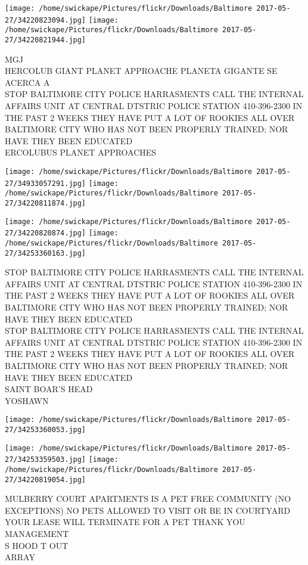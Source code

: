 \documentclass[10pt,letterpaper]{article}
\begin{document}
\texttt{[image: /home/swickape/Pictures/flickr/Downloads/Baltimore 2017-05-27/34220823094.jpg]}
\texttt{[image: /home/swickape/Pictures/flickr/Downloads/Baltimore 2017-05-27/34220821944.jpg]}

MGJ\\
HERCOLUB GIANT PLANET APPROACHE PLANETA GIGANTE SE ACERCA A\\
STOP BALTIMORE CITY POLICE HARRASMENTS CALL THE INTERNAL AFFAIRS UNIT AT CENTRAL DTSTRIC POLICE STATION 410{-}396{-}2300 IN THE PAST 2 WEEKS THEY HAVE PUT A LOT OF ROOKIES ALL OVER BALTIMORE CITY WHO HAS NOT BEEN PROPERLY TRAINED; NOR HAVE THEY BEEN EDUCATED\\
ERCOLUBUS PLANET APPROACHES
\pagebreak

\texttt{[image: /home/swickape/Pictures/flickr/Downloads/Baltimore 2017-05-27/34933057291.jpg]}
\texttt{[image: /home/swickape/Pictures/flickr/Downloads/Baltimore 2017-05-27/34220811874.jpg]}

\texttt{[image: /home/swickape/Pictures/flickr/Downloads/Baltimore 2017-05-27/34220820874.jpg]}
\texttt{[image: /home/swickape/Pictures/flickr/Downloads/Baltimore 2017-05-27/34253360163.jpg]}

STOP BALTIMORE CITY POLICE HARRASMENTS CALL THE INTERNAL AFFAIRS UNIT AT CENTRAL DTSTRIC POLICE STATION 410{-}396{-}2300 IN THE PAST 2 WEEKS THEY HAVE PUT A LOT OF ROOKIES ALL OVER BALTIMORE CITY WHO HAS NOT BEEN PROPERLY TRAINED; NOR HAVE THEY BEEN EDUCATED\\
STOP BALTIMORE CITY POLICE HARRASMENTS CALL THE INTERNAL AFFAIRS UNIT AT CENTRAL DTSTRIC POLICE STATION 410{-}396{-}2300 IN THE PAST 2 WEEKS THEY HAVE PUT A LOT OF ROOKIES ALL OVER BALTIMORE CITY WHO HAS NOT BEEN PROPERLY TRAINED; NOR HAVE THEY BEEN EDUCATED\\
SAINT BOAR'S HEAD\\
YOSHAWN
\pagebreak

\texttt{[image: /home/swickape/Pictures/flickr/Downloads/Baltimore 2017-05-27/34253360053.jpg]}

\vspace{0.25in}
\texttt{[image: /home/swickape/Pictures/flickr/Downloads/Baltimore 2017-05-27/34253359503.jpg]}
\texttt{[image: /home/swickape/Pictures/flickr/Downloads/Baltimore 2017-05-27/34220819054.jpg]}

MULBERRY COURT APARTMENTS IS A PET FREE COMMUNITY (NO EXCEPTIONS) NO PETS ALLOWED TO VISIT OR BE IN COURTYARD YOUR LEASE WILL TERMINATE FOR A PET THANK YOU MANAGEMENT\\
S HOOD T OUT\\
ARRAY
\pagebreak
\end{document}
